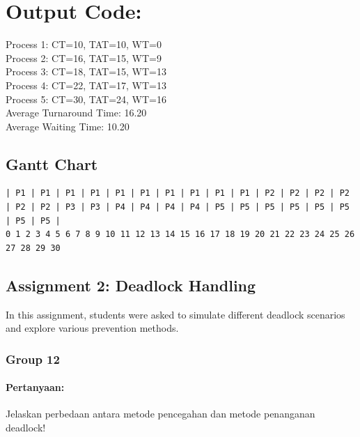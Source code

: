 \documentclass[12pt]{article}
\begin{document}
\section*{Output Code:}

Process 1: CT=10, TAT=10, WT=0 \\
Process 2: CT=16, TAT=15, WT=9 \\
Process 3: CT=18, TAT=15, WT=13 \\
Process 4: CT=22, TAT=17, WT=13 \\
Process 5: CT=30, TAT=24, WT=16 \\

Average Turnaround Time: 16.20 \\
Average Waiting Time: 10.20

\subsection*{Gantt Chart}

\begin{verbatim}
| P1 | P1 | P1 | P1 | P1 | P1 | P1 | P1 | P1 | P1 | P2 | P2 | P2 | P2 | P2 | P2 | P3 | P3 | P4 | P4 | P4 | P4 | P5 | P5 | P5 | P5 | P5 | P5 | P5 | P5 |
0 1 2 3 4 5 6 7 8 9 10 11 12 13 14 15 16 17 18 19 20 21 22 23 24 25 26 27 28 29 30
\end{verbatim}




\subsection{Assignment 2: Deadlock Handling}
In this assignment, students were asked to simulate different deadlock scenarios and explore various prevention methods.


\subsubsection{Group 12}

\paragraph{Pertanyaan:} Jelaskan perbedaan antara metode pencegahan dan metode penanganan deadlock!
\end{document}
